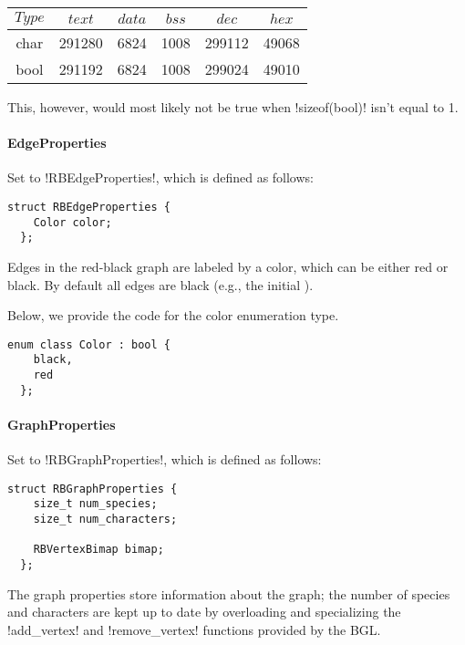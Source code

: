 \begin{center}
  \begin{tabular}{c | c c c c c}
    $Type$ & $text$ & $data$ & $bss$ & $dec$  & $hex$ \\
    \hline
    char   & 291280 & 6824   & 1008  & 299112 & 49068 \\
    bool   & 291192 & 6824   & 1008  & 299024 & 49010
  \end{tabular}
\end{center}

This, however, would most likely not be true when !sizeof(bool)! isn't equal to 1.

\paragraph{EdgeProperties}

Set to !RBEdgeProperties!, which is defined as follows:

\begin{lstlisting}[moreemph={Color}]
  struct RBEdgeProperties {
    Color color;
  };
\end{lstlisting}

Edges in the red-black graph are labeled by a color, which can be either red or black.
By default all edges are black (e.g., the initial \grb{}).

Below, we provide the code for the color enumeration type.

\begin{lstlisting}[belowskip=0pt]
  enum class Color : bool {
    black,
    red
  };
\end{lstlisting}

\paragraph{GraphProperties}

Set to !RBGraphProperties!, which is defined as follows:

\begin{lstlisting}[moreemph={RBVertexBimap}]
  struct RBGraphProperties {
    size_t num_species;
    size_t num_characters;

    RBVertexBimap bimap;
  };
\end{lstlisting}

The graph properties store information about the graph; the number of species and characters are kept up to date by overloading and specializing the !add_vertex! and !remove_vertex! functions provided by the BGL.

